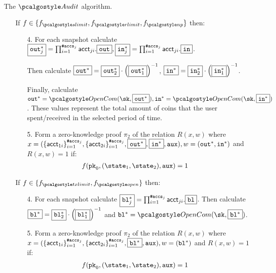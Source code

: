 \begin{boxfig}{\label{fig:audit}{The $\audit$ algorithm.}}
\begin{enumerate}
   \item[]
    {
        If $f \in \{f_{\sendlimit}, f_{\receivelimit}, f_{\nonpart}\}$ then:
        \begin{enumerate}
            \item[4.] For each snapshot calculate $\fbox{$\textup{\texttt{{out}}}^{*}_{j}$} = \prod_{i=1}^{\textup{\texttt{\#accs}}_j} {\textup{\textsf{acct}}_{ji}.\fbox{$\textup{\texttt{{out}}}$}}, \fbox{$\textup{\texttt{{in}}}^{*}_{j}$} = \prod_{i=1}^{\textup{\texttt{\#accs}}_j} {\textup{\textsf{acct}}_{ji}.\fbox{$\textup{\texttt{{in}}}$}}$. 
            
            Then calculate $\fbox{$\textup{\texttt{{out}}}^*$} = \fbox{$\textup{\texttt{{out}}}^*_2$}\cdot \left(\fbox{$\textup{\texttt{{out}}}^*_1$}\right)^{-1}$, $\fbox{$\textup{\texttt{{in}}}^*$} = \fbox{$\textup{\texttt{{in}}}^*_2$}\cdot \left(\fbox{$\textup{\texttt{{in}}}^*_1$}\right)^{-1}$.

            Finally, calculate $\varout^* = \opencom(\sk, \comm{\varout^*}), \varin^* = \opencom(\sk, \comm{\varin^*})$.
            These values represent the total amount of coins that the user spent/received in the selected period of time.
            \item[5.] Form a zero-knowledge proof  $\pi_2$ of the relation $R(x,w)$ where
             $x=(\{ \textup{\textsf{acct}}_{1i} \}_{i=1}^{\textup{\texttt{\#accs}}_j}, \{ \textup{\textsf{acct}}_{2i} \}_{i=1}^{\textup{\texttt{\#accs}}_j}, \fbox{$\textup{\texttt{{out}}}^*$}, \fbox{$\textup{\texttt{{in}}}^{*}$}, {\textup{\texttt{aux}}}), w=(\textup{\texttt{{out}}}^*, \textup{\texttt{{in}}}^*)$
            and $R(x,w) = 1$ if:
            {\begin{align*}
                & f(\inpk, (\snap_1, \snap_2), \aux) =1 
            \end{align*} }
        \end{enumerate}
    }
        
    \item[] 
    {
        If $f \in \{f_{\txnlimit}, f_{\open}\}$ then:
        \begin{enumerate}
            \item[4.] For each snapshot calculate $\fbox{$\textup{\texttt{{bl}}}^{*}_{j}$} = \prod_{i=1}^{\textup{\texttt{\#accs}}_j} {\textup{\textsf{acct}}_{ji}.\fbox{$\textup{\texttt{{bl}}}$}}$. Then calculate $\fbox{$\textup{\texttt{{bl}}}^*$} = \fbox{$\textup{\texttt{{bl}}}^*_2$}\cdot \left(\fbox{$\textup{\texttt{{bl}}}^*_1$}\right)^{-1}$ and $\varbl^* = \opencom(\sk, \comm{\varbl^*})$.
            \item[5.] Form a zero-knowledge proof $\pi_2$ of the relation $R(x,w)$ where $x=(\{ \textup{\textsf{acct}}_{1i} \}_{i=1}^{\textup{\texttt{\#accs}}_j}, \{ \textup{\textsf{acct}}_{2i} \}_{i=1}^{\textup{\texttt{\#accs}}_j}, \fbox{$\textup{\texttt{{bl}}}^{*}$}, {\textup{\texttt{aux}}}), w=(\textup{\texttt{{bl}}}^*)$ and $R(x,w)=1$ if:
            {\begin{align*}
                & f(\inpk, (\snap_1, \snap_2), \aux) =1 
            \end{align*} }
        \end{enumerate}
    }
 

\end{enumerate}
\end{boxfig}
